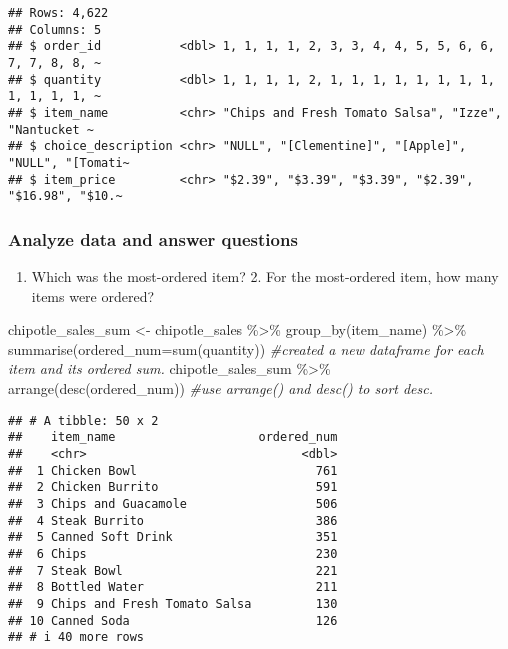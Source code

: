 \documentclass[
]{article}
\newenvironment{Shaded}{\begin{snugshade}}{\end{snugshade}}
\newcommand{\AttributeTok}[1]{\textcolor[rgb]{0.77,0.63,0.00}{#1}}
\newcommand{\CommentTok}[1]{\textcolor[rgb]{0.56,0.35,0.01}{\textit{#1}}}
\newcommand{\FunctionTok}[1]{\textcolor[rgb]{0.00,0.00,0.00}{#1}}
\newcommand{\NormalTok}[1]{#1}
\newcommand{\OtherTok}[1]{\textcolor[rgb]{0.56,0.35,0.01}{#1}}
\newcommand{\SpecialCharTok}[1]{\textcolor[rgb]{0.00,0.00,0.00}{#1}}
\providecommand{\tightlist}{%
  \setlength{\itemsep}{0pt}\setlength{\parskip}{0pt}}
\begin{document}
\begin{verbatim}
## Rows: 4,622
## Columns: 5
## $ order_id           <dbl> 1, 1, 1, 1, 2, 3, 3, 4, 4, 5, 5, 6, 6, 7, 7, 8, 8, ~
## $ quantity           <dbl> 1, 1, 1, 1, 2, 1, 1, 1, 1, 1, 1, 1, 1, 1, 1, 1, 1, ~
## $ item_name          <chr> "Chips and Fresh Tomato Salsa", "Izze", "Nantucket ~
## $ choice_description <chr> "NULL", "[Clementine]", "[Apple]", "NULL", "[Tomati~
## $ item_price         <chr> "$2.39", "$3.39", "$3.39", "$2.39", "$16.98", "$10.~
\end{verbatim}

\hypertarget{analyze-data-and-answer-questions}{%
\subsubsection{Analyze data and answer
questions}\label{analyze-data-and-answer-questions}}

\begin{enumerate}
\def\labelenumi{\arabic{enumi}.}
\tightlist
\item
  Which was the most-ordered item? 2. For the most-ordered item, how
  many items were ordered?
\end{enumerate}

\begin{Shaded}
\begin{Highlighting}[]
\NormalTok{chipotle\_sales\_sum }\OtherTok{\textless{}{-}}\NormalTok{ chipotle\_sales }\SpecialCharTok{\%\textgreater{}\%} 
  \FunctionTok{group\_by}\NormalTok{(item\_name) }\SpecialCharTok{\%\textgreater{}\%} 
  \FunctionTok{summarise}\NormalTok{(}\AttributeTok{ordered\_num=}\FunctionTok{sum}\NormalTok{(quantity)) }\CommentTok{\#created a new dataframe for each item and its ordered sum. }
\NormalTok{chipotle\_sales\_sum }\SpecialCharTok{\%\textgreater{}\%} \FunctionTok{arrange}\NormalTok{(}\FunctionTok{desc}\NormalTok{(ordered\_num)) }\CommentTok{\#use arrange() and desc() to sort desc. }
\end{Highlighting}
\end{Shaded}

\begin{verbatim}
## # A tibble: 50 x 2
##    item_name                    ordered_num
##    <chr>                              <dbl>
##  1 Chicken Bowl                         761
##  2 Chicken Burrito                      591
##  3 Chips and Guacamole                  506
##  4 Steak Burrito                        386
##  5 Canned Soft Drink                    351
##  6 Chips                                230
##  7 Steak Bowl                           221
##  8 Bottled Water                        211
##  9 Chips and Fresh Tomato Salsa         130
## 10 Canned Soda                          126
## # i 40 more rows
\end{verbatim}
\end{document}
